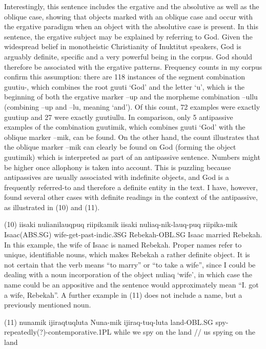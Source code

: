 \documentclass[12pt]{article}
\begin{document}
Interestingly, this sentence includes the ergative and the absolutive as well as the oblique case, showing that objects marked with an oblique case and occur with the ergative paradigm when an object with the absolutive case is present. 
In this sentence, the ergative subject may be explained by referring to God. Given the widespread belief in monotheistic Christianity of Inuktitut speakers, God is arguably definite, specific and a very powerful being in the corpus. God should therefore be associated with the ergative patterns. Frequency counts in my corpus confirm this assumption: there are 118 instances of the segment combination guutiu-, which combines the root guuti ‘God’ and the letter ‘u’, which is the beginning of both the ergative marker –up and the morpheme combination –ullu (combining –up and  –lu, meaning ‘and’). Of this count, 72 examples were exactly guutiup and 27 were exactly guutiullu. In comparison, only 5 antipassive examples of the combination guutimik, which combines guuti ‘God’ with the oblique marker –mik, can be found.
On the other hand, the count illustrates that the oblique marker –mik can clearly be found on God (forming the object guutimik) which is interpreted as part of an antipassive sentence. Numbers might be higher once allophony is taken into account. This is puzzling because antipassives are usually associated with indefinite objects, and God is a frequently referred-to and therefore a definite entity in the text. I have, however, found several other cases with definite readings in the context of the antipassive, as illustrated in (10) and (11). 

(10) iisaki                  nulianilauqpuq                riipikamik 
        iisaki                  nuliaq-nik-lauq-puq        riipika-mik 
                    Isaac(ABS.SG)  wife-get-past-indic.3SG Rebekah-OBL.SG
	        Isaac married Rebekah.
In this example, the wife of Isaac is named Rebekah. Proper names refer to unique, identifiable nouns, which makes Rebekah a rather definite object. It is not certain that the verb means “to marry” or “to take a wife”, since I could be dealing with a noun incorporation of the object nuliaq ‘wife’, in which case the name could be an appositive and the sentence would approximately mean “I. got a wife, Rebekah”. A further example in (11) does not include a name, but a previously mentioned noun.

(11) nunamik           ijiraqtuqluta
        Nuna-mik        ijiraq-tuq-luta
        land-OBL.SG spy-repeatedly(?)-contemporative.1PL
        while we spy on the land // us spying on the land
\end{document}
